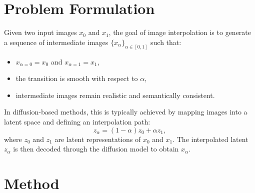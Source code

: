 \documentclass{article}
\begin{document}


\section{Problem Formulation}

Given two input images $x_0$ and $x_1$, the goal of image interpolation is to generate a sequence of intermediate images $\{x_\alpha\}_{\alpha \in [0,1]}$ such that:
\begin{itemize}
    \item $x_{\alpha=0} = x_0$ and $x_{\alpha=1} = x_1$,
    \item the transition is smooth with respect to $\alpha$,
    \item intermediate images remain realistic and semantically consistent.
\end{itemize}

In diffusion-based methods, this is typically achieved by mapping images into a latent space and defining an interpolation path:
\[
z_\alpha = (1 - \alpha) z_0 + \alpha z_1,
\]
where $z_0$ and $z_1$ are latent representations of $x_0$ and $x_1$. The interpolated latent $z_\alpha$ is then decoded through the diffusion model to obtain $x_\alpha$.


\section{Method}
\end{document}
